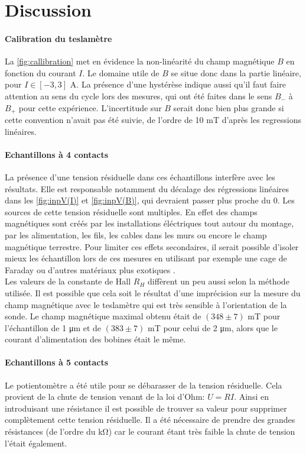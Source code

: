 \section{Discussion}

\paragraph*{Calibration du teslamètre}
La \autoref{fig:callibration} met en évidence la non-linéarité du champ magnétique \(B\) en fonction du courant \(I\). Le domaine utile de \(B\) se situe donc dans la partie linéaire, pour \(I \in [-3, 3]\) \si{\ampere}. La présence d'une hystérèse indique aussi qu'il faut faire attention au sens du cycle lors des mesures, qui ont été faites dans le sens \(B_-\) à \(B_+\) pour cette expérience. L'incertitude sur \(B\) serait donc bien plus grande si cette convention n'avait pas été suivie, de l'ordre de 10 \si{\milli\tesla} d'après les regressions linéaires.

\paragraph*{Echantillons à 4 contacts}
La présence d'une tension résiduelle dans ces échantillons interfère avec les résultats. Elle est responsable notamment du décalage des régressions linéaires dans les \autoref{fig:inpV(I)} et \autoref{fig:inpV(B)}, qui devraient passer plus proche du 0. Les sources de cette tension résiduelle sont multiples. En effet des champs magnétiques sont créés par les installations éléctriques tout autour du montage, par les alimentation, les fils, les cables dans les murs ou encore le champ magnétique terrestre. Pour limiter ces effets secondaires, il serait possible d'isoler mieux les échantillon lors de ces mesures en utilisant par exemple une cage de Faraday ou d'autres matériaux plus exotiques \cite{em_shielding}.\\
Les valeurs de la constante de Hall \(R_H\) diffèrent un peu aussi selon la méthode utilisée. Il est possible que cela soit le résultat d'une imprécision sur la mesure du champ magnétique avec le teslamètre qui est très sensible à l'orientation de la sonde. Le champ magnétique maximal obtenu était de \((348 \pm 7)\) \si{\milli\tesla} pour l'échantillon de 1 \si{\micro\meter} et de \((383 \pm 7)\) \si{\milli\tesla} pour celui de 2 \si{\micro\meter}, alors que le courant d'alimentation des bobines était le même.


\paragraph*{Echantillons à 5 contacts}
Le potientomètre a été utile pour se débarasser de la tension résiduelle. Cela provient de la chute de tension venant de la loi d'Ohm: \(U = R I\). Ainsi en introduisant une résistance il est possible de trouver sa valeur pour supprimer complètement cette tension résiduelle. Il a été nécessaire de prendre des grandes résistances (de l'ordre du \si{\kilo \ohm}) car le courant étant très faible la chute de tension l'était également.

